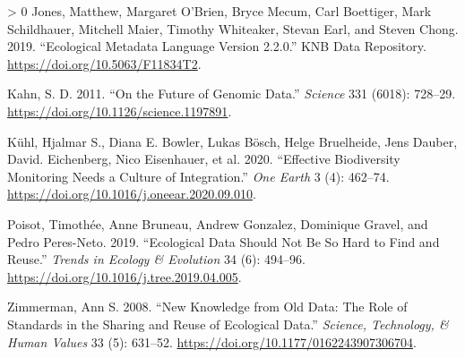 \documentclass[11pt]{article}
\newlength{\cslhangindent}
\newenvironment{CSLReferences}[3] %
 {%
  \setlength{\parindent}{0pt}
  \ifodd #1 \everypar{\setlength{\hangindent}{\cslhangindent}}\ignorespaces\fi
  \ifnum #2 > 0
  \setlength{\parskip}{#2\baselineskip}
  \fi
 }%
 {}
\begin{document}
\begin{CSLReferences}{1}{0}
\leavevmode\hypertarget{ref-Jones2019EcoMet}{}%
Jones, Matthew, Margaret O'Brien, Bryce Mecum, Carl Boettiger, Mark
Schildhauer, Mitchell Maier, Timothy Whiteaker, Stevan Earl, and Steven
Chong. 2019. {``Ecological Metadata Language Version 2.2.0.''} KNB Data
Repository. \url{https://doi.org/10.5063/F11834T2}.

\leavevmode\hypertarget{ref-Kahn2011FutGen}{}%
Kahn, S. D. 2011. {``On the Future of Genomic Data.''} \emph{Science}
331 (6018): 728--29. \url{https://doi.org/10.1126/science.1197891}.

\leavevmode\hypertarget{ref-Kuhl2020EffBio}{}%
Kühl, Hjalmar S., Diana E. Bowler, Lukas Bösch, Helge Bruelheide, Jens
Dauber, David. Eichenberg, Nico Eisenhauer, et al. 2020. {``Effective
Biodiversity Monitoring Needs a Culture of Integration.''} \emph{One
Earth} 3 (4): 462--74.
\url{https://doi.org/10.1016/j.oneear.2020.09.010}.

\leavevmode\hypertarget{ref-Poisot2019EcoDat}{}%
Poisot, Timothée, Anne Bruneau, Andrew Gonzalez, Dominique Gravel, and
Pedro Peres-Neto. 2019. {``Ecological Data Should Not Be So Hard to Find
and Reuse.''} \emph{Trends in Ecology \& Evolution} 34 (6): 494--96.
\url{https://doi.org/10.1016/j.tree.2019.04.005}.

\leavevmode\hypertarget{ref-Zimmerman2008NewKno}{}%
Zimmerman, Ann S. 2008. {``New Knowledge from Old Data: The Role of
Standards in the Sharing and Reuse of Ecological Data.''} \emph{Science,
Technology, \& Human Values} 33 (5): 631--52.
\url{https://doi.org/10.1177/0162243907306704}.

\end{CSLReferences}
\end{document}
